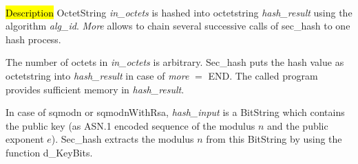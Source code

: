 
      
 \\ [0.5cm]

\hl{Description}
OctetString {\em in\_octets} is hashed into octetstring {\em hash\_result} using the algorithm
{\em alg\_id}. {\em More} allows to chain several successive calls of sec\_hash to one
hash process. 

The number of octets in {\em in\_octets} is arbitrary. Sec\_hash puts the hash value as octetstring into
{\em hash\_result} in case of {\em more} $=$ END. The called program provides sufficient memory
in {\em hash\_result}. 

In case of sqmodn or sqmodnWithRsa, {\em hash\_input} is a BitString which contains the 
public key (as ASN.1 encoded sequence of the modulus $n$ and the public
exponent $e$). Sec\_hash extracts the modulus $n$ from this BitString by using the function
d\_KeyBits.

